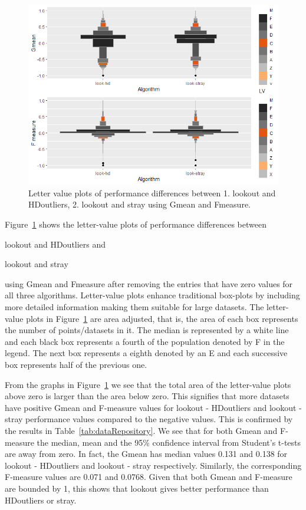 \documentclass[letter,12pt]{article}
\begin{document}
\begin{figure}[!ht]
    \centering
    \includegraphics[scale=0.7]{lvplots.png}
    \caption{Letter value plots of performance differences between 1. lookout and HDoutliers, 2. lookout and stray using Gmean and Fmeasure.}
    \label{fig:lvplots}
\end{figure}

Figure~\ref{fig:lvplots}  shows the letter-value plots \citep{lvplots}  of performance differences between \begin{inparaenum} \item lookout and HDoutliers and \item lookout and stray \end{inparaenum}  using Gmean and Fmeasure after removing the entries that have zero values for all three algorithms. Letter-value plots enhance traditional box-plots by including more detailed information making them suitable for large datasets. The  letter-value plots in Figure~\ref{fig:lvplots} are area adjusted, that is, the area of each box represents the number of points/datasets in it. The median is represented by a white line and each black box represents a fourth of the population denoted by F in the legend. The next box represents a eighth denoted by an E and each successive box represents half of the previous one. 

From the graphs in Figure~\ref{fig:lvplots}  we see that the total area of the letter-value plots above zero is larger than the area below zero. This signifies that more datasets have positive Gmean and F-measure values for lookout - HDoutliers and lookout - stray performance values compared to the negative values.  This is confirmed by the results in Table~\ref{tab:dataRepository}. We see that for both Gmean and  F-measure the median, mean and the 95\% confidence interval from Student's t-tests are away from zero. In fact, the Gmean has median values  0.131 and 0.138 for lookout - HDoutliers and lookout - stray respectively. Similarly, the corresponding F-measure values are 0.071 and 0.0768. Given that both Gmean and F-measure are bounded by 1, this shows that lookout gives better performance than HDoutliers or stray. 
\end{document}
